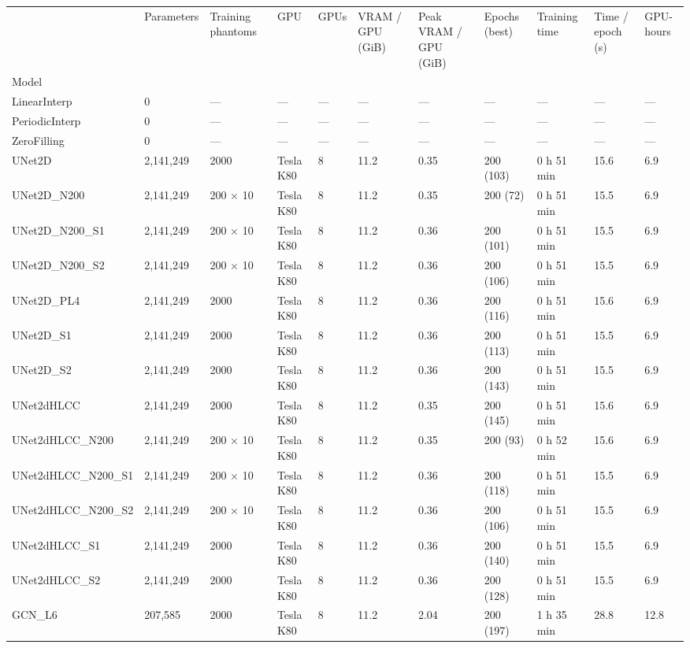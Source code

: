\begin{tabular}{lllllllllll}
\toprule
 & Parameters & Training phantoms & GPU & GPUs & VRAM / GPU (GiB) & Peak VRAM / GPU (GiB) & Epochs (best) & Training time & Time / epoch (s) & GPU-hours \\
Model &  &  &  &  &  &  &  &  &  &  \\
\midrule
LinearInterp & 0 & — & — & — & — & — & — & — & — & — \\
PeriodicInterp & 0 & — & — & — & — & — & — & — & — & — \\
ZeroFilling & 0 & — & — & — & — & — & — & — & — & — \\
UNet2D & 2,141,249 & 2000 & Tesla K80 & 8 & 11.2 & 0.35 & 200 (103) & 0 h 51 min & 15.6 & 6.9 \\
UNet2D\_N200 & 2,141,249 & 200 $\times$ 10 & Tesla K80 & 8 & 11.2 & 0.35 & 200 (72) & 0 h 51 min & 15.5 & 6.9 \\
UNet2D\_N200\_S1 & 2,141,249 & 200 $\times$ 10 & Tesla K80 & 8 & 11.2 & 0.36 & 200 (101) & 0 h 51 min & 15.5 & 6.9 \\
UNet2D\_N200\_S2 & 2,141,249 & 200 $\times$ 10 & Tesla K80 & 8 & 11.2 & 0.36 & 200 (106) & 0 h 51 min & 15.5 & 6.9 \\
UNet2D\_PL4 & 2,141,249 & 2000 & Tesla K80 & 8 & 11.2 & 0.36 & 200 (116) & 0 h 51 min & 15.6 & 6.9 \\
UNet2D\_S1 & 2,141,249 & 2000 & Tesla K80 & 8 & 11.2 & 0.36 & 200 (113) & 0 h 51 min & 15.5 & 6.9 \\
UNet2D\_S2 & 2,141,249 & 2000 & Tesla K80 & 8 & 11.2 & 0.36 & 200 (143) & 0 h 51 min & 15.5 & 6.9 \\
UNet2dHLCC & 2,141,249 & 2000 & Tesla K80 & 8 & 11.2 & 0.35 & 200 (145) & 0 h 51 min & 15.6 & 6.9 \\
UNet2dHLCC\_N200 & 2,141,249 & 200 $\times$ 10 & Tesla K80 & 8 & 11.2 & 0.35 & 200 (93) & 0 h 52 min & 15.6 & 6.9 \\
UNet2dHLCC\_N200\_S1 & 2,141,249 & 200 $\times$ 10 & Tesla K80 & 8 & 11.2 & 0.36 & 200 (118) & 0 h 51 min & 15.5 & 6.9 \\
UNet2dHLCC\_N200\_S2 & 2,141,249 & 200 $\times$ 10 & Tesla K80 & 8 & 11.2 & 0.36 & 200 (106) & 0 h 51 min & 15.5 & 6.9 \\
UNet2dHLCC\_S1 & 2,141,249 & 2000 & Tesla K80 & 8 & 11.2 & 0.36 & 200 (140) & 0 h 51 min & 15.5 & 6.9 \\
UNet2dHLCC\_S2 & 2,141,249 & 2000 & Tesla K80 & 8 & 11.2 & 0.36 & 200 (128) & 0 h 51 min & 15.5 & 6.9 \\
GCN\_L6 & 207,585 & 2000 & Tesla K80 & 8 & 11.2 & 2.04 & 200 (197) & 1 h 35 min & 28.8 & 12.8 \\

\end{tabular}
